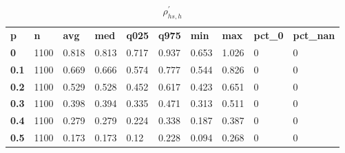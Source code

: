 \begin{table}[h]
 \centering 
\footnotesize
\caption{$\rho_{hs,h}^\prime $}
\label{tab:alphahsh}
\begin{tabular}[h]{| l l l l l l l l l l|
    } \hline
\textbf{ p} & \textbf{ n} & \textbf{ avg} & \textbf{ med} & \textbf{ q025} & \textbf{ q975} & \textbf{ min} & \textbf{ max} & \textbf{ pct\_0} & \textbf{ pct\_nan}
           \\
  \textbf{  0} & 1100 & 0.818 & 0.813 & 0.717 & 0.937 & 0.653 & 1.026 & 0 & 0
           \\
  \textbf{0.1} & 1100 & 0.669 & 0.666 & 0.574 & 0.777 & 0.544 & 0.826 & 0 & 0
           \\
  \textbf{0.2} & 1100 & 0.529 & 0.528 & 0.452 & 0.617 & 0.423 & 0.651 & 0 & 0
           \\
  \textbf{0.3} & 1100 & 0.398 & 0.394 & 0.335 & 0.471 & 0.313 & 0.511 & 0 & 0
           \\
  \textbf{0.4} & 1100 & 0.279 & 0.279 & 0.224 & 0.338 & 0.187 & 0.387 & 0 & 0
           \\
  \textbf{0.5} & 1100 & 0.173 & 0.173 &  0.12 & 0.228 & 0.094 & 0.268 & 0 & 0
           \\
 \hline \end{tabular}
 \end{table}
